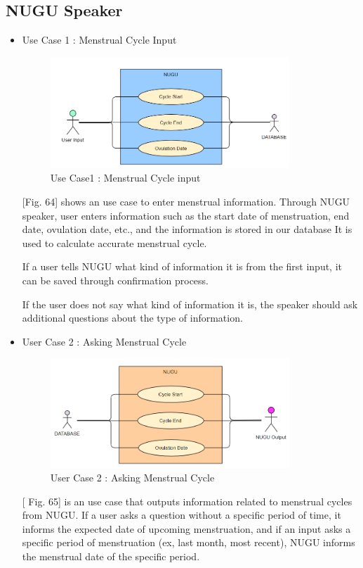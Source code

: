 \documentclass[conference]{IEEEtran}
\begin{document}
\subsection{NUGU Speaker}
\begin{itemize}
   
    \item Use Case 1 : Menstrual Cycle Input
    \begin{figure}[ht]
    \includegraphics[width=9cm, center]{inputinfo.PNG}
    \caption{Use Case1 : Menstrual Cycle input}
    \label{fig64}
    \end{figure}
    [Fig. 64] shows an use case to enter menstrual information. Through NUGU speaker, user enters information such as the start date of menstruation, end date, ovulation date, etc., and the information is stored in our database It is used to calculate accurate menstrual cycle. \par
    
    \setlength{\parindent}{2ex} If a user tells NUGU what kind of information it is from the first input, it can be saved through confirmation process.
   
   \setlength{\parindent}{2ex} If the user does not say what kind of information it is, the speaker should ask additional questions about the type of information.
    
    \item User Case 2 : Asking Menstrual Cycle
    
    \begin{figure}[ht]
    \includegraphics[width=9cm, center]{outputinfo.PNG}
    \caption{User Case 2 : Asking Menstrual Cycle}
    \label{fig65}
    \end{figure}
   \setlength{\parindent}{2ex} [ Fig. 65] is an use case that outputs information related to menstrual cycles from NUGU. If a user asks a question without a specific period of time, it informs the expected date of upcoming menstruation, and if an input asks a specific period of menstruation (ex, last month, most recent), NUGU informs the menstrual date of the specific period.
    

\end{itemize}
\end{document}
